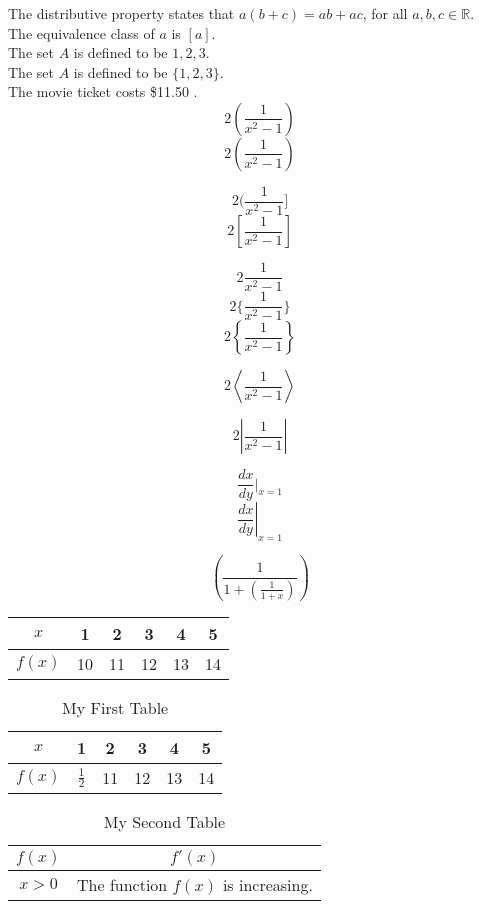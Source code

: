 \documentclass[11pt]{article}
\begin{document}
The distributive property states that $a(b+c)=ab+ac$, for all $a, b, c \in \mathbb{R}$. \\[6pt]
The equivalence class of $a$ is $[a]$.\\[6pt]
The set $A$ is defined to be ${1,2,3}$.\\[6pt]
The set $A$ is defined to be $\{1,2,3\}$.\\[6pt]
The movie ticket costs \$11.50 .\\[6pt]

$$2(\frac{1}{x^2-1})$$
$$2\left(\frac{1}{x^2-1}\right)$$

$$2(\frac{1}{x^2-1}]$$
$$2\left[\frac{1}{x^2-1}\right]$$

$$2{\frac{1}{x^2-1}}$$
$$2\{\frac{1}{x^2-1}\}$$
$$2\left\{\frac{1}{x^2-1}\right\}$$

$$2\left \langle      \frac{1}{x^2-1}\right \rangle $$

$$2\left|\frac{1}{x^2-1}\right|$$


$$\frac{dx}{dy}|_{x=1}$$
$$\left.\frac{dx}{dy}\right|_{x=1}$$

$$\left(\frac{1}{1+\left(\frac{1}{1+x}\right)}\right)$$

\begin{tabular}{|c||c|c|c|c|c|}
\hline
$x$&1&2&3&4&5\\ \hline
$f(x)$&10&11&12&13&14\\ \hline
\end{tabular}

\vspace{1cm}

\begin{table}[H]
\caption{My First Table}
\centering
\def\arraystretch{1.5}
\begin{tabular}{|c||c|c|c|c|c|}
\hline
$x$&1&2&3&4&5\\ \hline
$f(x)$&$\frac{1}{2}$&11&12&13&14\\ \hline
\end{tabular}
\end{table} 


\begin{table}[H]

\centering
\def\arraystretch{1.5}
\begin{tabular}{|c||c|}
\hline
$f(x)$&$f'(x)$\\ \hline
$x>0$& The function $f(x)$ is increasing.\\ \hline
\end{tabular}
\caption{My Second Table}
\end{table} 
\end{document}
